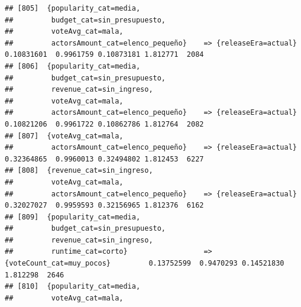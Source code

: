 \documentclass[
]{article}
\begin{document}
\begin{verbatim}
## [805]  {popularity_cat=media,                                                                                                   
##         budget_cat=sin_presupuesto,                                                                                             
##         voteAvg_cat=mala,                                                                                                       
##         actorsAmount_cat=elenco_pequeño}    => {releaseEra=actual}               0.10831601  0.9961759 0.10873181 1.812771  2084
## [806]  {popularity_cat=media,                                                                                                   
##         budget_cat=sin_presupuesto,                                                                                             
##         revenue_cat=sin_ingreso,                                                                                                
##         voteAvg_cat=mala,                                                                                                       
##         actorsAmount_cat=elenco_pequeño}    => {releaseEra=actual}               0.10821206  0.9961722 0.10862786 1.812764  2082
## [807]  {voteAvg_cat=mala,                                                                                                       
##         actorsAmount_cat=elenco_pequeño}    => {releaseEra=actual}               0.32364865  0.9960013 0.32494802 1.812453  6227
## [808]  {revenue_cat=sin_ingreso,                                                                                                
##         voteAvg_cat=mala,                                                                                                       
##         actorsAmount_cat=elenco_pequeño}    => {releaseEra=actual}               0.32027027  0.9959593 0.32156965 1.812376  6162
## [809]  {popularity_cat=media,                                                                                                   
##         budget_cat=sin_presupuesto,                                                                                             
##         revenue_cat=sin_ingreso,                                                                                                
##         runtime_cat=corto}                  => {voteCount_cat=muy_pocos}         0.13752599  0.9470293 0.14521830 1.812298  2646
## [810]  {popularity_cat=media,                                                                                                   
##         voteAvg_cat=mala,                                                                                                       

\end{verbatim}
\end{document}
